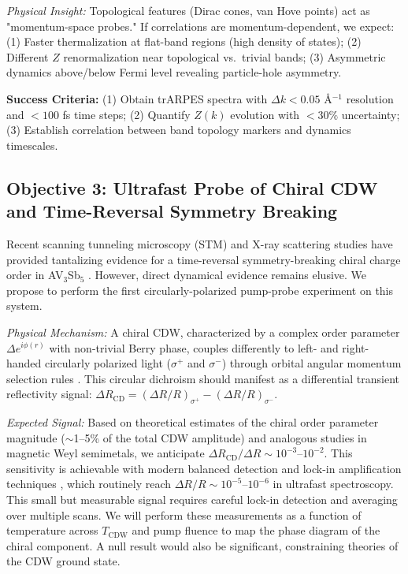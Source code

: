 \documentclass[12pt,a4paper]{article}
\begin{document}
\textit{Physical Insight:} Topological features (Dirac cones, van Hove points) act as "momentum-space probes." If correlations are momentum-dependent, we expect: (1) Faster thermalization at flat-band regions (high density of states); (2) Different $Z$ renormalization near topological vs.~trivial bands; (3) Asymmetric dynamics above/below Fermi level revealing particle-hole asymmetry.

\textbf{Success Criteria:} (1) Obtain trARPES spectra with $\Delta k < 0.05$ Å$^{-1}$ resolution and $<100$ fs time steps; (2) Quantify $Z(k)$ evolution with $<30\%$ uncertainty; (3) Establish correlation between band topology markers and dynamics timescales.

\subsection{Objective 3: Ultrafast Probe of Chiral CDW and Time-Reversal Symmetry Breaking} Recent scanning tunneling microscopy (STM) and X-ray scattering studies have provided tantalizing evidence for a time-reversal symmetry-breaking chiral charge order in AV$_3$Sb$_5$ \cite{Jiang2021, Shrestha2023}. However, direct dynamical evidence remains elusive. We propose to perform the first circularly-polarized pump-probe experiment on this system.

\textit{Physical Mechanism:} A chiral CDW, characterized by a complex order parameter $\Delta e^{i\phi(r)}$ with non-trivial Berry phase, couples differently to left- and right-handed circularly polarized light ($\sigma^+$ and $\sigma^-$) through orbital angular momentum selection rules \cite{Wang2020}. This circular dichroism should manifest as a differential transient reflectivity signal: $\Delta R_{\text{CD}} = (\Delta R/R)_{\sigma^+} - (\Delta R/R)_{\sigma^-}$.

\textit{Expected Signal:} Based on theoretical estimates of the chiral order parameter magnitude ($\sim$1--5\% of the total CDW amplitude) and analogous studies in magnetic Weyl semimetals, we anticipate $\Delta R_{\text{CD}} / \Delta R \sim 10^{-3}$--$10^{-2}$. This sensitivity is achievable with modern balanced detection and lock-in amplification techniques \cite{Giannetti2016}, which routinely reach $\Delta R/R \sim 10^{-5}$--$10^{-6}$ in ultrafast spectroscopy. This small but measurable signal requires careful lock-in detection and averaging over multiple scans. We will perform these measurements as a function of temperature across $T_{\text{CDW}}$ and pump fluence to map the phase diagram of the chiral component. A null result would also be significant, constraining theories of the CDW ground state.
\end{document}
